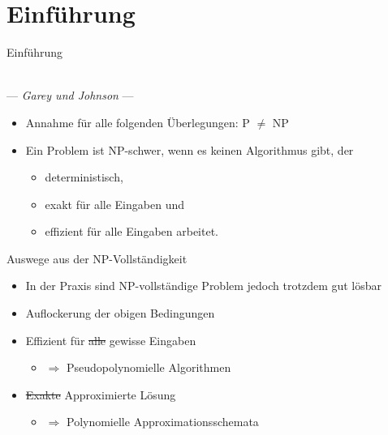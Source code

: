 \section{Einführung}

\begin{frame}{Einführung}
	\begin{minipage}[t][0.25\textheight]{1\textwidth}
		\centering
		 \\ --- \textit{Garey und Johnson} ---
	\end{minipage}
	\pause
	\begin{minipage}[t][0.5\textheight]{1\textwidth}
	\begin{itemize}
		\item Annahme für alle folgenden Überlegungen: P $\neq$ NP
		\item Ein Problem ist NP-schwer, wenn es keinen Algorithmus gibt, der
			\begin{itemize}
				\item	deterministisch,
				\item exakt für alle Eingaben und 
				\item	effizient für alle Eingaben arbeitet.
			\end{itemize}
		\end{itemize}
	\end{minipage}
\end{frame}

\begin{frame}{Auswege aus der NP-Vollständigkeit}
\begin{itemize}
	\item In der Praxis sind NP-vollständige Problem jedoch trotzdem gut lösbar
	\item Auflockerung der obigen Bedingungen
	\item Effizient für \st{alle} gewisse Eingaben 
	\begin{itemize}
		\item[] $\Rightarrow$ Pseudopolynomielle Algorithmen
	\end{itemize}
	\item \st{Exakte} Approximierte Lösung
	\begin{itemize}
		\item[] $\Rightarrow$ Polynomielle Approximationsschemata
	\end{itemize}
\end{itemize}
\end{frame}

